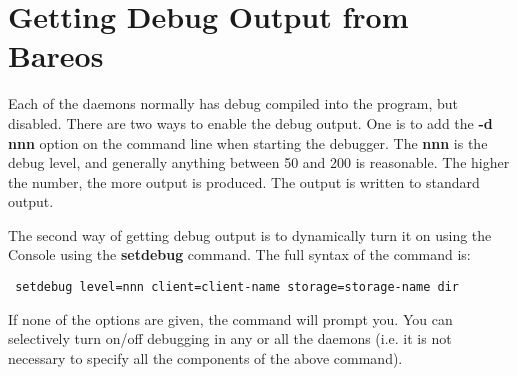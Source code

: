 \section{Getting Debug Output from Bareos}
Each of the daemons normally has debug compiled into the program, but
disabled. There are two ways to enable the debug output. One is to add the
{\bf -d nnn} option on the command line when starting the debugger. The {\bf
nnn} is the debug level, and generally anything between 50 and 200 is
reasonable. The higher the number, the more output is produced. The output is
written to standard output.

The second way of getting debug output is to dynamically turn it on using the
Console using the {\bf setdebug} command. The full syntax of the command is:

\footnotesize
\begin{verbatim}
 setdebug level=nnn client=client-name storage=storage-name dir
\end{verbatim}
\normalsize

If none of the options are given, the command will prompt you. You can
selectively turn on/off debugging in any or all the daemons (i.e. it is not
necessary to specify all the components of the above command).
